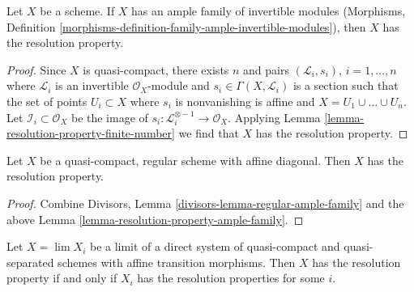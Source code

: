 \begin{lemma}
\label{lemma-resolution-property-ample-family}
Let $X$ be a scheme. If $X$ has an ample family of invertible modules
(Morphisms, Definition
\ref{morphisms-definition-family-ample-invertible-modules}),
then $X$ has the resolution property.
\end{lemma}

\begin{proof}
Since $X$ is quasi-compact, there exists $n$ and pairs
$(\mathcal{L}_i, s_i)$, $i = 1, \ldots, n$ where
$\mathcal{L}_i$ is an invertible $\mathcal{O}_X$-module and
$s_i \in \Gamma(X, \mathcal{L}_i)$ is a section
such that the set of points $U_i \subset X$ where $s_i$ is nonvanishing
is affine and $X = U_1 \cup \ldots \cup U_n$.
Let $\mathcal{I}_i \subset \mathcal{O}_X$ be the image
of $s_i : \mathcal{L}_i^{\otimes -1} \to \mathcal{O}_X$.
Applying Lemma \ref{lemma-resolution-property-finite-number}
we find that $X$ has the resolution property.
\end{proof}

\begin{lemma}
\label{lemma-regular-resolution-property}
Let $X$ be a quasi-compact, regular scheme with affine diagonal.
Then $X$ has the resolution property.
\end{lemma}

\begin{proof}
Combine Divisors, Lemma \ref{divisors-lemma-regular-ample-family} and the above
Lemma \ref{lemma-resolution-property-ample-family}.
\end{proof}

\begin{lemma}
\label{lemma-resolution-property-descends}
Let $X = \lim X_i$ be a limit of a direct system of quasi-compact
and quasi-separated schemes with affine transition morphisms.
Then $X$ has the resolution property if and only if $X_i$ has
the resolution properties for some $i$.
\end{lemma}

